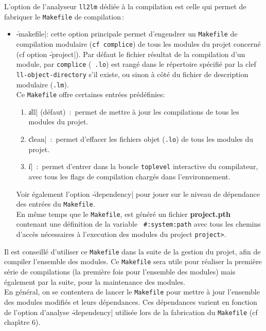 L'option de l'analyseur {\tt ll2lm} d\'{e}di\'{e}e \`{a} la compilation est
celle qui permet de 
fabriquer le {\tt Makefile} de compilation\,:
\begin{itemize}

\item {\Large \|-makefile|}: cette option principale permet
d'engendrer un {\tt Makefile} de compilation modulaire ({\tt cf
complice}) de tous les modules du projet concern\'{e} (cf option
\|-project|). Par d\'{e}faut le fichier r\'{e}sultat de la compilation 
d'un module, par {\tt complice} ({\tt
.lo}) est rang\'{e} dans le r\'{e}pertoire sp\'{e}cifi\'{e} par la clef {\tt
ll-object-directory} s'il existe, ou sinon \`{a} c\^{o}t\'{e} du fichier de
description modulaire ({\tt .lm}). \\
Ce {\tt Makefile} offre certaines entr\'{e}es pr\'{e}d\'{e}finies:
\begin {enumerate}
\item \|all| (d\'{e}faut)\ :\ 
permet de mettre \`{a} jour les compilations de tous les modules du projet.
\item \|clean|\ :\ 
permet d'effacer les fichiers objet ({\tt .lo}) de tous les
modules du projet.
\BeginLL
\EndLL
\item \|i|\ :\ 
permet d'entrer dans la boucle {\tt toplevel} interactive du
compilateur, avec tous les flags de compilation charg\'{e}s dans
l'environnement. 
\BeginLL
\EndLL
\end{enumerate}
Voir \'{e}galement l'option \|-dependency| pour jouer sur le niveau de
d\'{e}pendance des entr\'{e}es du {\tt Makefile}.\\
En m\^{e}me temps que le {\tt Makefile}, est g\'{e}n\'{e}r\'{e} un fichier {\bf
project.pth} contenant une d\'{e}finition de la variable {\tt
\#:system:path} avec tous les chemins d'acc\`{e}s n\'{e}cessaires \`{a}
l'execution des modules du project {\tt project>}.

\end{itemize}

Il est conseill\'{e} d'utiliser
ce {\tt Makefile} dans la suite de la gestion du projet, afin de
compiler l'ensemble des modules. Ce {\tt Makefile} sera utile pour
r\'{e}aliser la premi\`{e}re s\'{e}rie de compilations (la premi\`{e}re fois pour
l'ensemble des modules) mais \'{e}galement par la suite, pour la 
maintenance des modules. \\
En g\'{e}n\'{e}ral, on se contentera de lancer le {\tt Makefile} pour mettre
\`{a} jour l'ensemble des modules modifi\'{e}s et leurs d\'{e}pendances.
Ces d\'{e}pendances varient en fonction de l'option d'analyse \|-dependency|
utilis\'{e}e lors de la fabrication du {\tt Makefile} (cf chap\^{\i}tre 6).

